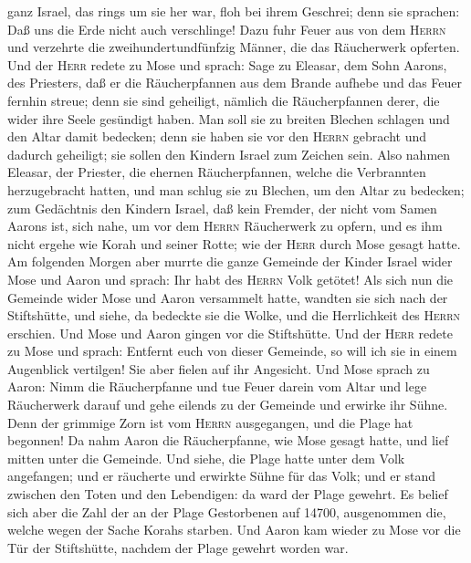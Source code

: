 ganz Israel, das rings um sie her war, floh bei ihrem Geschrei; denn sie
sprachen: Daß uns die Erde nicht auch verschlinge!  Dazu
fuhr Feuer aus von dem \textsc{Herrn} und verzehrte die
zweihundertundfünfzig Männer, die das Räucherwerk opferten.
 Und der \textsc{Herr} redete zu Mose und sprach:
 Sage zu Eleasar, dem Sohn Aarons, des Priesters, daß er
die Räucherpfannen aus dem Brande aufhebe und das Feuer fernhin streue;
 denn sie sind geheiligt, nämlich die Räucherpfannen
derer, die wider ihre Seele gesündigt haben. Man soll sie zu breiten
Blechen schlagen und den Altar damit bedecken; denn sie haben sie vor
den \textsc{Herrn} gebracht und dadurch geheiligt; sie sollen den
Kindern Israel zum Zeichen sein.  Also nahmen Eleasar,
der Priester, die ehernen Räucherpfannen, welche die Verbrannten
herzugebracht hatten, und man schlug sie zu Blechen, um den Altar zu
bedecken;  zum Gedächtnis den Kindern Israel, daß kein
Fremder, der nicht vom Samen Aarons ist, sich nahe, um vor dem
\textsc{Herrn} Räucherwerk zu opfern, und es ihm nicht ergehe wie Korah
und seiner Rotte; wie der \textsc{Herr} durch Mose gesagt hatte.
 Am folgenden Morgen aber murrte die ganze Gemeinde der
Kinder Israel wider Mose und Aaron und sprach: Ihr habt des
\textsc{Herrn} Volk getötet!  Als sich nun die Gemeinde
wider Mose und Aaron versammelt hatte, wandten sie sich nach der
Stiftshütte, und siehe, da bedeckte sie die Wolke, und die Herrlichkeit
des \textsc{Herrn} erschien.  Und Mose und Aaron gingen
vor die Stiftshütte.  Und der \textsc{Herr} redete zu
Mose und sprach:  Entfernt euch von dieser Gemeinde, so
will ich sie in einem Augenblick vertilgen!  Sie aber
fielen auf ihr Angesicht. Und Mose sprach zu Aaron: Nimm die
Räucherpfanne und tue Feuer darein vom Altar und lege Räucherwerk darauf
und gehe eilends zu der Gemeinde und erwirke ihr Sühne. Denn der
grimmige Zorn ist vom \textsc{Herrn} ausgegangen, und die Plage hat
begonnen!  Da nahm Aaron die Räucherpfanne, wie Mose
gesagt hatte, und lief mitten unter die Gemeinde. Und siehe, die Plage
hatte unter dem Volk angefangen; und er räucherte und erwirkte Sühne für
das Volk;  und er stand zwischen den Toten und den
Lebendigen: da ward der Plage gewehrt.  Es belief sich
aber die Zahl der an der Plage Gestorbenen auf 14700, ausgenommen die,
welche wegen der Sache Korahs starben.  Und Aaron kam
wieder zu Mose vor die Tür der Stiftshütte, nachdem der Plage gewehrt
worden war.

